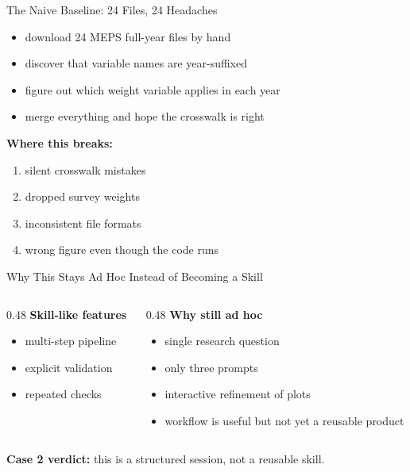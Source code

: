 \documentclass[10pt,english,aspectratio=169]{beamer}
\begin{document}
\begin{frame}{The Naive Baseline: 24 Files, 24 Headaches}
\begin{itemize}
    \item download 24 MEPS full-year files by hand
    \item discover that variable names are year-suffixed
    \item figure out which weight variable applies in each year
    \item merge everything and hope the crosswalk is right
\end{itemize}

\vspace{0.3cm}
\textbf{Where this breaks:}
\begin{enumerate}
    \item silent crosswalk mistakes
    \item dropped survey weights
    \item inconsistent file formats
    \item wrong figure even though the code runs
\end{enumerate}
\end{frame}

\begin{frame}{Why This Stays Ad Hoc Instead of Becoming a Skill}
\begin{columns}[T]
\begin{column}{0.48\textwidth}
\textbf{Skill-like features}
\begin{itemize}
    \item multi-step pipeline
    \item explicit validation
    \item repeated checks
\end{itemize}
\end{column}
\begin{column}{0.48\textwidth}
\textbf{Why still ad hoc}
\begin{itemize}
    \item single research question
    \item only three prompts
    \item interactive refinement of plots
    \item workflow is useful but not yet a reusable product
\end{itemize}
\end{column}
\end{columns}

\vspace{0.3cm}
\textbf{Case 2 verdict:} this is a structured session, not a reusable skill.
\end{frame}
\end{document}
